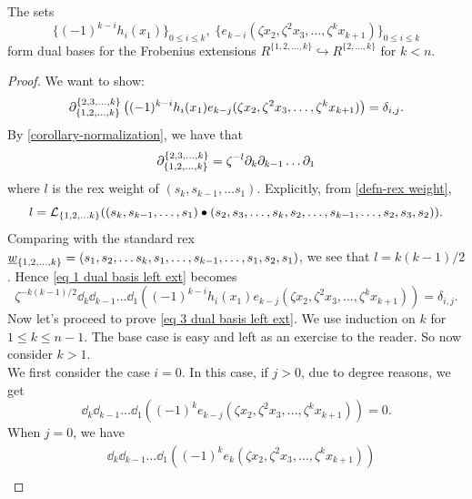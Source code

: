 \begin{lemma}\label{lemma dual basis left ext} The sets 
   $$ \{(-1)^{k-i}h_i(x_1)\}_{0\leq i \leq k},\;\{e_{k-i}(\zeta x_2, \zeta^2 x_3, \ldots, \zeta^{k}x_{k+1}) \}_{0\leq i \leq k}$$ form dual bases for the Frobenius extensions $R^{\{1,2, \ldots, k\}} \hookrightarrow R^{\{2, \ldots, k\}}$ for $k<n$. 
 
\end{lemma}
\begin{proof}
    We want to show:
    \begin{equation}\label{eq 1 dual basis left ext} 
        \partial_{\{1,2, \ldots,k\}}^{\{2,3, \ldots, k\}}\left((-1)^{k-i}h_i(x_1)e_{k-j}(\zeta x_2, \zeta^2 x_3, \ldots, \zeta^{k}x_{k+1})\right)=\delta_{i,j}.
    \end{equation}
    By \cref{corollary-normalization}, we have that 
    \begin{equation} \label{eq 2 dual basis left ext}
        \partial_{\{1,2, \ldots,k\}}^{\{2,3, \ldots, k\}}=\zeta^{-l}\partial_k \partial_{k-1} \ldots \partial_1
    \end{equation}
    where $l$ is the rex weight of $(s_k, s_{k-1}, \ldots s_1)$.
    Explicitly, from \cref{defn-rex weight}, 
    $$l=\mathcal{L}_{\{1,2,\ldots k\}}((s_k,s_{k-1},\ldots, s_1)\bullet (s_2, s_3, \ldots, s_k, s_2, \ldots, s_{k-1}, \ldots, s_2, s_3, s_2) ).$$
    Comparing with the standard rex $\underline{w}_{\{1,2,\ldots,k\}}=(s_1,s_2, \ldots s_k, s_1, \ldots ,s_{k-1}, \ldots, s_1, s_2, s_1)$, we see that
    $l=k(k-1)/2$.
    Hence \cref{eq 1 dual basis left ext} becomes
    \begin{equation}\label{eq 3 dual basis left ext}
        \zeta^{-k(k-1)/2}\dd_k \dd_{k-1} \ldots \dd_1\left((-1)^{k-i}h_i(x_1)e_{k-j}(\zeta x_2, \zeta^2 x_3, \ldots, \zeta^{k}x_{k+1})\right)=\delta_{i,j}.
    \end{equation}
    Now let's proceed to prove \cref{eq 3 dual basis left ext}. We use induction on $k$ for $1\leq k \leq n-1$. The base case is easy and left as an exercise to the reader. So now consider $k>1$.\\
    We first consider the case $i=0$. 
    In this case, if $j>0$, due to degree reasons, we get 
    $$\dd_k \dd_{k-1} \ldots \dd_1\left((-1)^{k}e_{k-j}(\zeta x_2, \zeta^2 x_3, \ldots, \zeta^{k}x_{k+1})\right)=0.$$
    When $j=0$, we have
    \begin{align}
        \nonumber&\dd_k \dd_{k-1} \ldots \dd_1\left((-1)^{k}e_{k}(\zeta x_2, \zeta^2 x_3, \ldots, \zeta^{k}x_{k+1})\right)\\

\end{align}
\end{proof}
